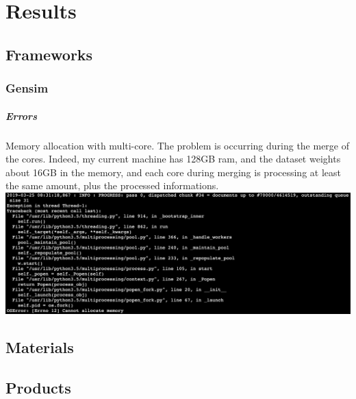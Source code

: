 \chapter{Results}
\label{chap:results}

\section{Frameworks}
\subsection{Gensim} 
\paragraph{Errors} Memory allocation with multi-core. The problem is occurring during the merge of the cores. Indeed, my current machine has 128GB ram, and the dataset weights about 16GB in the memory, and each core during merging is processing at least the same amount, plus the processed informations.\\ 

\includegraphics[width=\linewidth]{99-imgs/gensim_memory_allocation_error}

\section{Materials}

\section{Products}
